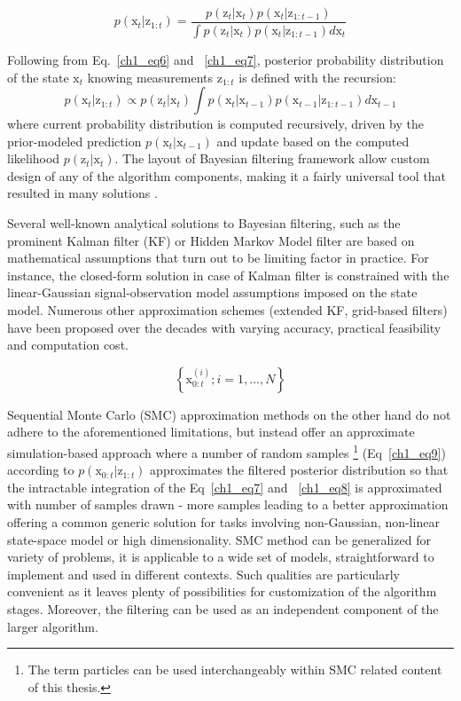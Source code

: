 \begin{equation}
p(\mathrm{x}_t | \mathrm{z}_{1:t}) = \frac{p(\mathrm{z}_t | \mathrm{x}_t) p(\mathrm{x}_t | \mathrm{z}_{1:t-1})}{ \int p(\mathrm{z}_t | \mathrm{x}_t) p(\mathrm{x}_t | \mathrm{z}_{1:t-1}) d\mathrm{x}_t}
\label{ch1_eq7}
\end{equation} 

Following from Eq.~\ref{ch1_eq6} and ~\ref{ch1_eq7}, posterior probability distribution of the state $\mathrm{x}_t$ knowing measurements $\mathrm{z}_{1:t}$ is defined with the recursion:  
\begin{equation}
p(\mathrm{x}_t | \mathrm{z}_{1:t}) \propto p(\mathrm{z}_t | \mathrm{x}_t) \int p(\mathrm{x}_t | \mathrm{x}_{t-1}) p(\mathrm{x}_{t-1} | \mathrm{z}_{1:t-1}) d\mathrm{x}_{t-1}
\label{ch1_eq8}
\end{equation}
where current probability distribution is computed recursively, driven by the prior-modeled prediction $p(\mathrm{x}_t | \mathrm{x}_{t-1})$ and update based on the computed likelihood $p(\mathrm{z}_t | \mathrm{x}_t)$. The layout of Bayesian filtering framework allow custom design of any of the algorithm components, making it a fairly universal tool that resulted in many solutions \cite{sarkka2013bayesian}.    

Several well-known analytical solutions to Bayesian filtering, such as the prominent Kalman filter (KF) or Hidden Markov Model filter are based on mathematical assumptions that turn out to be limiting factor in practice. For instance, the closed-form solution in case of Kalman filter is constrained  with the linear-Gaussian signal-observation model assumptions imposed on the state model. Numerous other approximation schemes (extended KF, grid-based filters) have been proposed over the decades with varying accuracy, practical feasibility and computation cost. 

\begin{equation}
\left\lbrace \mathrm{x}_{0:t}^{(i)}; i = 1, ... , N \right\rbrace 
\label{ch1_eq9}
\end{equation}

Sequential Monte Carlo (SMC) approximation methods \cite{arulampalam2002tutorial} on the other hand do not adhere to the aforementioned limitations, but instead offer an approximate simulation-based approach where a number of random samples \footnote{The term particles can be used interchangeably within SMC related content of this thesis.} (Eq~\ref{ch1_eq9}) according to $p(\mathrm{x}_{0:t} | \mathrm{z}_{1:t})$ approximates the filtered posterior distribution so that the intractable integration of the Eq~\ref{ch1_eq7} and ~\ref{ch1_eq8} is approximated with number of samples drawn - more samples leading to a better approximation offering a common generic solution for tasks involving non-Gaussian, non-linear state-space model or high dimensionality. SMC method can be generalized for variety of problems, it is applicable to a wide set of models, straightforward to implement and used in different contexts. Such qualities are particularly convenient as it leaves plenty of possibilities for customization of the algorithm stages. Moreover, the filtering can be used as an independent component of the larger algorithm. 

